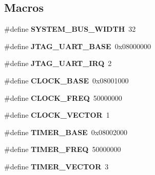 \subsection*{Macros}
\begin{DoxyCompactItemize}
\item 
\mbox{\label{group__RTEMSBSPsNios2ISS_gaa0323188efb3e001c8a3b601fa1bb08e}} 
\#define {\bfseries S\+Y\+S\+T\+E\+M\+\_\+\+B\+U\+S\+\_\+\+W\+I\+D\+TH}~32
\item 
\mbox{\label{group__RTEMSBSPsNios2ISS_gaa9fc53b3bbb4c691b4cb6595df77baf5}} 
\#define {\bfseries J\+T\+A\+G\+\_\+\+U\+A\+R\+T\+\_\+\+B\+A\+SE}~0x08000000
\item 
\mbox{\label{group__RTEMSBSPsNios2ISS_ga74ba5398a84caab9302282182c0dd6af}} 
\#define {\bfseries J\+T\+A\+G\+\_\+\+U\+A\+R\+T\+\_\+\+I\+RQ}~2
\item 
\mbox{\label{group__RTEMSBSPsNios2ISS_ga1d7518f2f06463bee4f910c9327b7f1a}} 
\#define {\bfseries C\+L\+O\+C\+K\+\_\+\+B\+A\+SE}~0x08001000
\item 
\mbox{\label{group__RTEMSBSPsNios2ISS_ga9d53f8509e83dab48b3e6868774fb56b}} 
\#define {\bfseries C\+L\+O\+C\+K\+\_\+\+F\+R\+EQ}~50000000
\item 
\mbox{\label{group__RTEMSBSPsNios2ISS_ga4edae1f7872fdace9eb64c197b3f952d}} 
\#define {\bfseries C\+L\+O\+C\+K\+\_\+\+V\+E\+C\+T\+OR}~1
\item 
\mbox{\label{group__RTEMSBSPsNios2ISS_ga251f8c6600afee0dddf950c7a41d4723}} 
\#define {\bfseries T\+I\+M\+E\+R\+\_\+\+B\+A\+SE}~0x08002000
\item 
\mbox{\label{group__RTEMSBSPsNios2ISS_gacf926951944b6cf370b7229ebd50dd8b}} 
\#define {\bfseries T\+I\+M\+E\+R\+\_\+\+F\+R\+EQ}~50000000
\item 
\mbox{\label{group__RTEMSBSPsNios2ISS_ga664839648fa40e020db83c21689e0af9}} 
\#define {\bfseries T\+I\+M\+E\+R\+\_\+\+V\+E\+C\+T\+OR}~3
\item 

\end{DoxyCompactItemize}
